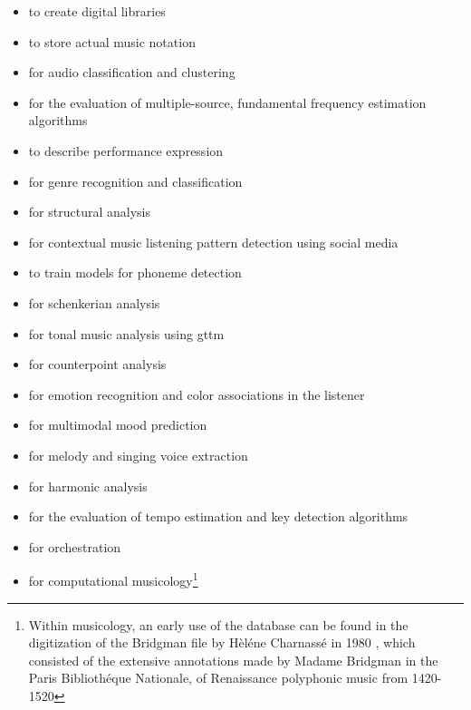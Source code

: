 \begin{itemize}
\item to create digital libraries \parencite{DBLP:conf/ismir/Dunn00}
\item to store actual music notation \parencite{DBLP:conf/ismir/Good00}
\item for audio classification and clustering \parencite{ilprints489, DBLP:conf/ismir/HomburgMMMW05}
\item for the evaluation of multiple-source, fundamental frequency estimation algorithms \parencite{DBLP:conf/ismir/YehBR07}
\item to describe performance expression \parencite{DBLP:conf/ismir/HashidaMK08}
\item for genre recognition and classification \parencite{Tza02:Mus, DBLP:conf/icmc/XuZY05, DBLP:conf/ismir/SillaKK08, icmc/bbp2372.2010.003, DBLP:journals/corr/abs-1803-04652, DBLP:journals/corr/WangH17a, DBLP:journals/corr/MitraS14,2010NJPh:12e3030C, DBLP:journals/corr/abs-0812-4235}
\item for structural analysis \parencite{DBLP:conf/ismir/SmithBFRD11}
\item for contextual music listening pattern detection using social media \parencite{DBLP:conf/ismir/HaugerSKT13}
\item to train models for phoneme detection \parencite{DBLP:conf/ismir/ProutskovaRWC12}
\item for schenkerian analysis \parencite{DBLP:conf/ismir/Kirlin14}
\item for tonal music analysis using \gls{gttm} \parencite{DBLP:conf/ismir/HamanakaHT14}
\item for counterpoint analysis \parencite{DBLP:conf/ismir/AntilaC14}
\item for emotion recognition and color associations in the listener \parencite{DBLP:conf/ismir/PesekGPSGSPM14}
\item for multimodal mood prediction \parencite{DBLP:journals/corr/abs-1809-07276}
\item for melody \parencite{DBLP:conf/ismir/BittnerSTMCB14} and singing voice \parencite{DBLP:journals/corr/abs-1711-00048} extraction
\item for harmonic analysis \parencite{DBLP:conf/ismir/DevaneyACN15}
\item for the evaluation of tempo estimation and key detection algorithms \parencite{DBLP:conf/ismir/KneesFHVBHG15}
\item for orchestration \parencite{DBLP:conf/ismir/CrestelEHM17}
\item for computational musicology\footnote{Within musicology, an early use of the database can be found in the digitization of the Bridgman file by Hèléne Charnassé in 1980 \parencite{icmc/bbp2372.1980.051}, which consisted of the extensive annotations made by Madame Bridgman in the Paris Bibliothéque Nationale, of Renaissance polyphonic music from 1420-1520} \parencite{DBLP:conf/ismir/Parada-Cabaleiro17}

\end{itemize}
